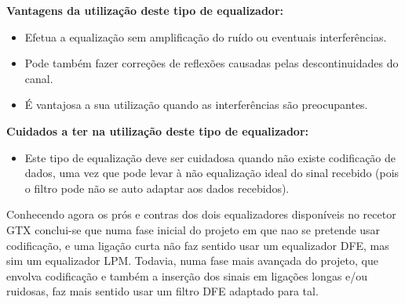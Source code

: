 \textbf{Vantagens da utilização deste tipo de equalizador:}
\begin{itemize}
	\item Efetua a equalização sem amplificação do ruído ou eventuais interferências.
	\item Pode também fazer correções de reflexões causadas pelas descontinuidades do canal. 
	\item É vantajosa a sua utilização quando as interferências são preocupantes.
\end{itemize}

\textbf{Cuidados a ter na utilização deste tipo de equalizador:}
\begin{itemize}
	\item Este tipo de equalização deve ser cuidadosa quando não existe codificação de dados, uma vez que pode levar à não equalização ideal do sinal recebido (pois o filtro pode não se auto adaptar aos dados recebidos).
\end{itemize}

Conhecendo agora os prós e contras dos dois equalizadores disponíveis no recetor GTX conclui-se que numa fase inicial do projeto em que nao se pretende usar codificação, e uma ligação curta não faz sentido usar um equalizador DFE, mas sim um equalizador LPM. Todavia, numa fase mais avançada do projeto, que envolva codificação e também a inserção dos sinais em ligações longas e/ou ruidosas, faz mais sentido usar um filtro DFE adaptado para tal. 

